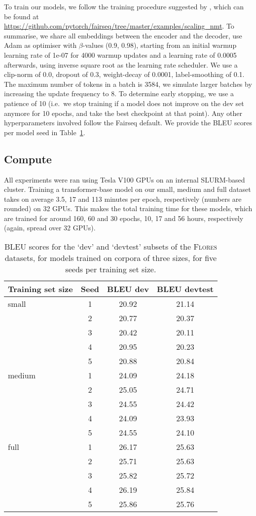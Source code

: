 To train our models, we follow the training procedure suggested by \citet{ott2018scaling}, which can be found at \url{https://github.com/pytorch/fairseq/tree/master/examples/scaling_nmt}.
To summarise, we share all embeddings between the encoder and the decoder, use Adam as optimiser with $\beta$-values (0.9, 0.98), starting from an initial warmup learning rate of 1e-07 for 4000 warmup updates and a learning rate of 0.0005 afterwards, using inverse square root as the learning rate scheduler.
We use a clip-norm of 0.0, dropout of 0.3, weight-decay of 0.0001, label-smoothing of 0.1.
The maximum number of tokens in a batch is 3584, we simulate larger batches by increasing the update frequency to 8.
To determine early stopping, we use a patience of 10 (i.e.\ we stop training if a model does not improve on the dev set anymore for 10 epochs, and take the best checkpoint at that point).
Any other hyperparameters involved follow the Fairseq default.
We provide the BLEU scores per model seed in Table~\ref{tab:ap_bleu}.

\subsection{Compute}
All experiments were ran using Tesla V100 GPUs on an internal SLURM-based cluster. 
Training a transformer-base model on our small, medium and full dataset takes on average 3.5, 17 and 113 minutes per epoch, respectively (numbers are rounded) on 32 GPUs.
This makes the total training time for these models, which are trained for around 160, 60 and 30 epochs, 10,  17 and 56 hours, respectively (again, spread over 32 GPUs).


\begin{table}\centering\small
\begin{tabular}{lccc}
\toprule
\textbf{Training set size} & \textbf{Seed} & \textbf{BLEU dev} & \textbf{BLEU devtest} \\ \midrule \midrule
small & 1 & 20.92 & 21.14 \\
      & 2 & 20.77 & 20.37 \\
      & 3 & 20.42 & 20.11 \\
      & 4 & 20.95 & 20.23 \\
      & 5 & 20.88 & 20.84 \\\midrule
medium& 1 & 24.09 & 24.18 \\
      & 2 & 25.05 & 24.71 \\
      & 3 & 24.55 & 24.42 \\
      & 4 & 24.09 & 23.93 \\
      & 5 & 24.55 & 24.10 \\\midrule
full  & 1 & 26.17 & 25.63 \\
      & 2 & 25.71 & 25.63 \\
      & 3 & 25.82 & 25.72 \\
      & 4 & 26.19 & 25.84 \\
      & 5 & 25.86 & 25.76 \\\bottomrule
\end{tabular}
\caption{BLEU scores for the `dev' and `devtest' subsets of the \textsc{Flores} datasets, for models trained on corpora of three sizes, for five seeds per training set size.}
\label{tab:ap_bleu}
\end{table}
